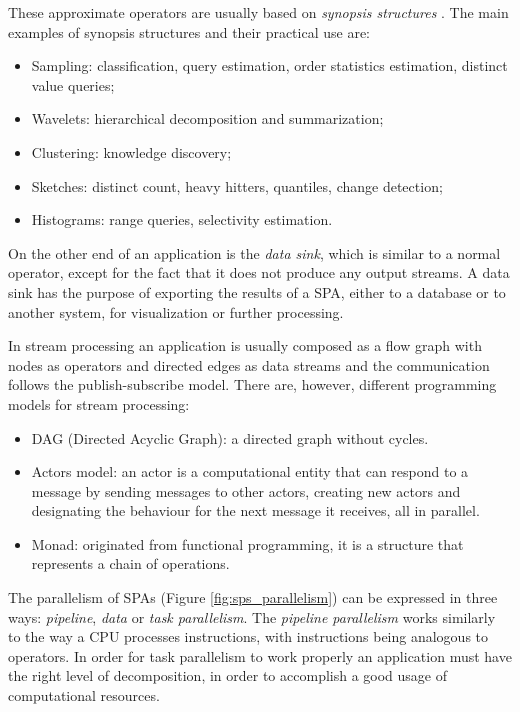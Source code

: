 \documentclass[ppgc,diss,english]{iiufrgs}
\begin{document}
These approximate operators are usually based on \emph{synopsis structures} \cite{aggarwal2007survey}. The main examples of synopsis structures and their practical use are:

\begin{itemize}
\item Sampling: classification, query estimation, order statistics estimation, distinct value queries;
\item Wavelets: hierarchical decomposition and summarization;
\item Clustering: knowledge discovery;
\item Sketches: distinct count, heavy hitters, quantiles, change detection;
\item Histograms: range queries, selectivity estimation.
\end{itemize}

On the other end of an application is the \emph{data sink}, which is similar to a normal operator, except for the fact that it does not produce any output streams. A data sink has the purpose of exporting the results of a SPA, either to a database or to another system, for visualization or further processing.


In stream processing an application is usually composed as a flow graph with nodes as operators and directed edges as data streams and the communication follows the publish-subscribe model. There are, however, different programming models for stream processing:

\begin{itemize}
\item DAG (Directed Acyclic Graph): a directed graph without cycles.
\item Actors model: an actor is a computational entity that can respond to a message by sending messages to other actors, creating new actors and designating the behaviour for the next message it receives, all in parallel.
\item Monad: originated from functional programming, it is a structure that represents a chain of operations.
\end{itemize}

The parallelism of SPAs (Figure \ref{fig:sps_parallelism}) can be expressed in three ways: \emph{pipeline}, \emph{data} or \emph{task parallelism}. The \emph{pipeline parallelism} works similarly to the way a CPU processes instructions, with instructions being analogous to operators. In order for task parallelism to work properly an application must have the right level of decomposition, in order to accomplish a good usage of computational resources.
\end{document}
